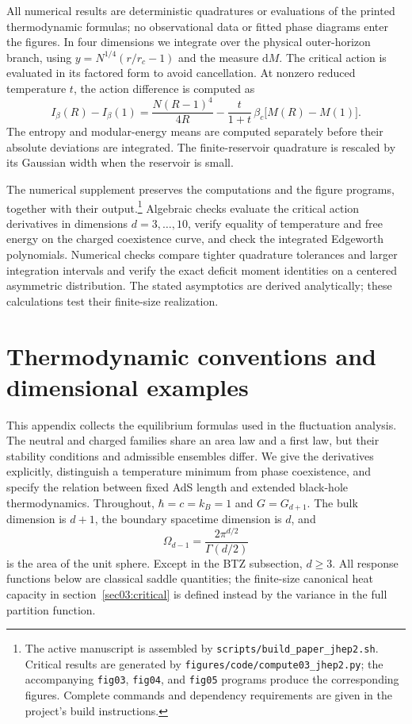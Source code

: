 \documentclass[11pt,letterpaper]{article}
\newcommand{\dd}{\mathrm{d}}
\theoremstyle{plain}
\theoremstyle{definition}
\theoremstyle{remark}
\begin{document}
All numerical results are deterministic quadratures or evaluations of the printed thermodynamic formulas; no observational data or fitted phase diagrams enter the figures. In four dimensions we integrate over the physical outer-horizon branch, using $y=N^{1/4}(r/r_c-1)$ and the measure $\dd M$. The critical action is evaluated in its factored form to avoid cancellation. At nonzero reduced temperature $t$, the action difference is computed as
\begin{equation}
 I_{\beta}(R)-I_{\beta}(1)
 =\frac{N(R-1)^4}{4R}
 -\frac{t}{1+t}\,\beta_c\bigl[M(R)-M(1)\bigr].
 \label{eq07:numerical_action}
\end{equation}
The entropy and modular-energy means are computed separately before their absolute deviations are integrated. The finite-reservoir quadrature is rescaled by its Gaussian width when the reservoir is small.

The numerical supplement preserves the computations and the figure programs, together with their output.\footnote{The active manuscript is assembled by \texttt{scripts/build\_paper\_jhep2.sh}. Critical results are generated by \texttt{figures/code/compute03\_jhep2.py}; the accompanying \texttt{fig03}, \texttt{fig04}, and \texttt{fig05} programs produce the corresponding figures. Complete commands and dependency requirements are given in the project's build instructions.} Algebraic checks evaluate the critical action derivatives in dimensions $d=3,\ldots,10$, verify equality of temperature and free energy on the charged coexistence curve, and check the integrated Edgeworth polynomials. Numerical checks compare tighter quadrature tolerances and larger integration intervals and verify the exact deficit moment identities on a centered asymmetric distribution. The stated asymptotics are derived analytically; these calculations test their finite-size realization.

\appendix

\section{Thermodynamic conventions and dimensional examples}
\label{app11:thermodynamics}

This appendix collects the equilibrium formulas used in the fluctuation
analysis.  The neutral and charged families share an area law and a first
law, but their stability conditions and admissible ensembles differ.  We
give the derivatives explicitly, distinguish a temperature minimum from
phase coexistence, and specify the relation between fixed AdS length and
extended black-hole thermodynamics.  Throughout, $\hbar=c=k_B=1$ and
$G=G_{d+1}$.  The bulk dimension is $d+1$, the boundary spacetime dimension
is $d$, and
\begin{equation}
 \Omega_{d-1}=\frac{2\pi^{d/2}}{\Gamma(d/2)}
 \label{eq11:sphere}
\end{equation}
is the area of the unit sphere.  Except in the BTZ subsection, $d\geq3$.
All response functions below are classical saddle quantities; the
finite-size canonical heat capacity in section~\ref{sec03:critical} is
defined instead by the variance in the full partition function.
\end{document}
